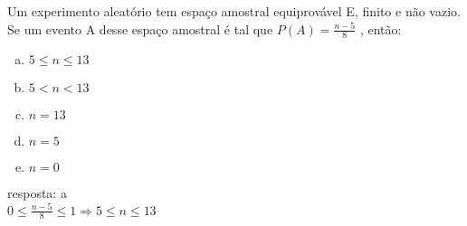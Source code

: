 \begin{ex}
 Um experimento aleatório tem espaço amostral equiprovável E, finito e não vazio. Se um evento A desse espaço amostral é tal que $P(A)=\frac{n-5}{8}$ , então:
   \begin{enumerate}[(a)]
   \item $ 5 \leq  n \leq  13 $
   \item $ 5 < n < 13 $
   \item $ n = 13 $
   \item $ n = 5 $
   \item $ n = 0 $
   \end{enumerate}
     \begin{sol}
      resposta: a \\
      $0\leq\frac{n-5}{8}\leq1 \Longrightarrow 5\leq n \leq13$
     \end{sol}
\end{ex}
